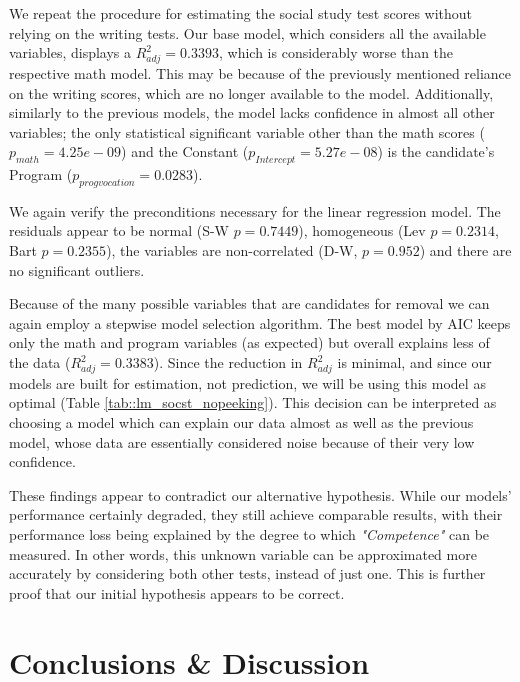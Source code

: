 \documentclass[10pt, a4paper]{article}
\begin{document}
	
	
	We repeat the procedure for estimating the social study test scores without relying on the writing tests. Our base model, which considers all the available variables, displays a $R^2_{adj} = 0.3393$, which is considerably worse than the respective math model. This may be because of the previously mentioned reliance on the writing scores, which are no longer available to the model. Additionally, similarly to the previous models, the model lacks confidence in almost all other variables; the only statistical significant variable other than the math scores ($p_{math} = 4.25e-09$) and the Constant ($p_{Intercept} = 5.27e-08$) is the candidate's Program ($p_{progvocation} = 0.0283$).
	
	We again verify the preconditions necessary for the linear regression model. The residuals appear to be normal (S-W $p = 0.7449$), homogeneous (Lev $p = 0.2314$, Bart $p = 0.2355$), the variables are non-correlated (D-W, $p=0.952$) and there are no significant outliers.
	
	Because of the many possible variables that are candidates for removal we can again employ a stepwise model selection algorithm. The best model by AIC keeps only the math and program variables (as expected) but overall explains less of the data ($R^2_{adj} = 0.3383$). Since the reduction in $R^2_{adj}$ is minimal, and since our models are built for estimation, not prediction, we will be using this model as optimal (Table \ref{tab::lm_socst_nopeeking}). This decision can be interpreted as choosing a model which can explain our data almost as well as the previous model, whose data are essentially considered noise because of their very low confidence.
	
	These findings appear to contradict our alternative hypothesis. While our models' performance certainly degraded, they still achieve comparable results, with their performance loss being explained by the degree to which \textit{"Competence"} can be measured. In other words, this unknown variable can be approximated more accurately by considering both other tests, instead of just one. This is further proof that our initial hypothesis appears to be correct.
	
	
	

	
	\section{Conclusions \& Discussion}
	\label{sec::conclusions}
	
\end{document}
